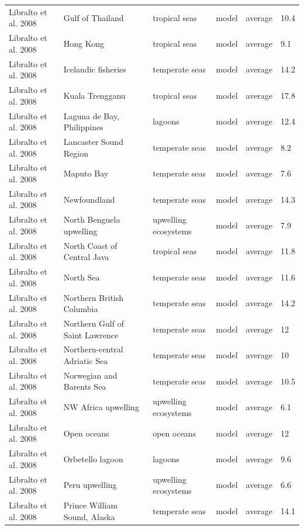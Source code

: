 \documentclass[oneside,12pt,final]{sty/ucthesis-CA2012}
\begin{document}
\begin{mainmatter}
\begin{longtable} {p{3cm}p{3cm}p{1.8cm}lp{2cm}p{1.7cm}}
    Libralto et al. 2008  & Gulf of Thailand & tropical seas & model & average & 10.4 \\
    Libralto et al. 2008  & Hong Kong & tropical seas & model & average & 9.1 \\
    Libralto et al. 2008   & Icelandic fisheries & temperate seas & model & average & 14.2 \\
    Libralto et al. 2008   & Kuala Trengganu & tropical seas & model & average & 17.8 \\
    Libralto et al. 2008   & Laguna de Bay, Philippines & lagoons & model & average & 12.4 \\
    Libralto et al. 2008  & Lancaster Sound Region & temperate seas & model & average & 8.2 \\
    Libralto et al. 2008   & Maputo Bay & temperate seas & model & average & 7.6 \\
    Libralto et al. 2008   & Newfoundland & temperate seas & model & average & 14.3 \\
    Libralto et al. 2008  &  North Benguela upwelling & upwelling ecosystems & model & average & 7.9 \\
    Libralto et al. 2008 & North Coast of Central Java & tropical seas & model & average & 11.8 \\
    Libralto et al. 2008   & North Sea & temperate seas & model & average & 11.6 \\
    Libralto et al. 2008  & Northern British Columbia & temperate seas & model & average & 14.2 \\
    Libralto et al. 2008   & Northern Gulf of Saint Lawrence  & temperate seas & model & average & 12 \\
    Libralto et al.  2008   & Northern-central Adriatic Sea  & temperate seas & model & average & 10 \\
    Libralto et al. 2008  & Norwegian and Barents Sea & temperate seas & model & average & 10.5 \\
    Libralto et al. 2008  & NW Africa upwelling & upwelling ecosystems & model & average & 6.1 \\
    Libralto et al. 2008  & Open oceans & open oceans & model & average & 12 \\
    Libralto et al. 2008   & Orbetello lagoon & lagoons & model & average & 9.6 \\
    Libralto et al. 2008   & Peru upwelling & upwelling ecosystems & model & average & 6.6 \\
    Libralto et al. 2008   & Prince William Sound, Alaska & temperate seas & model & average & 14.1 \\

\end{longtable}
\end{mainmatter}
\end{document}
